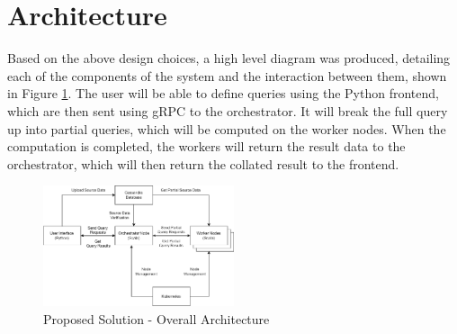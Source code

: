 \section{Architecture}\label{sec:architecture}
Based on the above design choices, a high level diagram was produced, detailing each of the components of the system and the interaction between them, shown in Figure \ref{fig:overall-architecture}. The user will be able to define queries using the Python frontend, which are then sent using gRPC to the orchestrator. It will break the full query up into partial queries, which will be computed on the worker nodes. When the computation is completed, the workers will return the result data to the orchestrator, which will then return the collated result to the frontend.

\begin{figure}[h]
	\centering
	\includegraphics[width=0.5\textwidth]{chapters/diagrams/design/architecture-overall}
	\caption{Proposed Solution - Overall Architecture}
	\label{fig:overall-architecture}
\end{figure}

